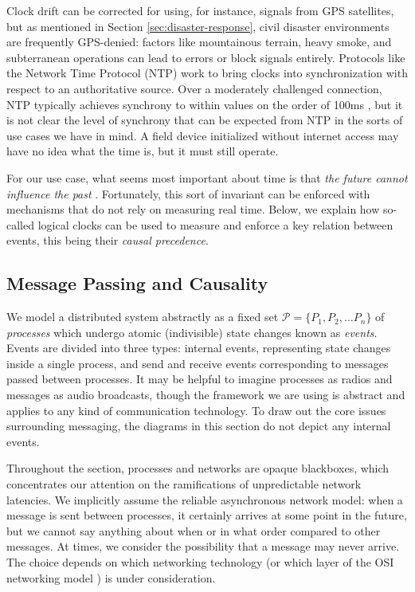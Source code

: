 \documentclass[]             %
{NASA}                       %
\theoremstyle{definition}
\begin{document}
Clock drift can be corrected for using, for instance, signals from GPS
satellites, but as mentioned in Section \ref{sec:disaster-response},
civil disaster environments are frequently GPS-denied: factors like
mountainous terrain, heavy smoke, and subterranean operations can lead
to errors or block signals entirely. Protocols like the Network Time
Protocol (NTP) \cite{rfc1119} work to bring clocks into
synchronization with respect to an authoritative source. Over a
moderately challenged connection, NTP typically achieves synchrony to
within values on the order of 100ms \citationneeded, but it is not
clear the level of synchrony that can be expected from NTP in the
sorts of use cases we have in mind. A field device initialized without
internet access may have no idea what the time is, but it must still
operate.

For our use case, what seems most important about time is that
\emph{the future cannot influence the past}
\cite{1989mattern}. Fortunately, this sort of invariant can be
enforced with mechanisms that do not rely on measuring real
time. Below, we explain how so-called logical clocks can be used to
measure and enforce a key relation between events, this being their
\emph{causal precedence}.


\subsection{Message Passing and Causality}
\label{ssec:message-passing}
We model a distributed system abstractly as a fixed set
$\mathcal{P} = \{P_1, P_2, \ldots P_n\}$ of \emph{processes} which
undergo atomic (indivisible) state changes known as
\emph{events}. Events are divided into three types: internal events,
representing state changes inside a single process, and send and
receive events corresponding to messages passed between processes. It
may be helpful to imagine processes as radios and messages as audio
broadcasts, though the framework we are using is abstract and applies
to any kind of communication technology. To draw out the core issues
surrounding messaging, the diagrams in this section do not depict any
internal events.

Throughout the section, processes and networks are opaque blackboxes,
which concentrates our attention on the ramifications of unpredictable
network latencies. We implicitly assume the reliable asynchronous
network model: when a message is sent between processes, it certainly
arrives at some point in the future, but we cannot say anything about
when or in what order compared to other messages. At times, we
consider the possibility that a message may never arrive. The choice
depends on which networking technology (or which layer of the OSI
networking model \citationneeded) is under consideration.
\end{document}
